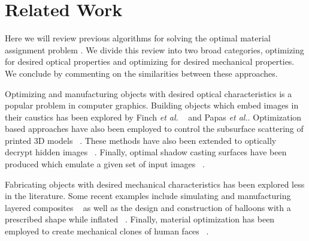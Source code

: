 \documentclass[annual]{acmsiggraph}
\begin{document}
\section{Related Work}



Here we will review previous algorithms for solving the optimal material assignment problem . We divide this review into two broad categories, optimizing for desired optical properties and optimizing for desired mechanical properties. We conclude by commenting on the similarities between these approaches.

Optimizing and manufacturing objects with desired optical characteristics is a popular problem in computer graphics. Building objects which embed images in their caustics has been explored by Finch \textit{et al.} ~ and Papas \textit{et al.}. Optimization based approaches have also been employed to control the subsurface scattering of printed 3D models ~\cite{Hasan:2010}. These methods have also been extended to optically decrypt hidden images ~\cite{Papas:2012}. Finally, optimal shadow casting surfaces have been produced which emulate a given set of input images ~\cite{Bermano:2012}.

Fabricating objects with desired mechanical characteristics has been explored less in the literature. Some recent examples include simulating and manufacturing layered composites ~\cite{Bickel:2010} as well as the design and construction of balloons with a prescribed shape while inflated ~\cite{sko:2012}. Finally, material optimization has been employed to create mechanical clones of human faces ~\cite{Bickel:2012}.
\end{document}
